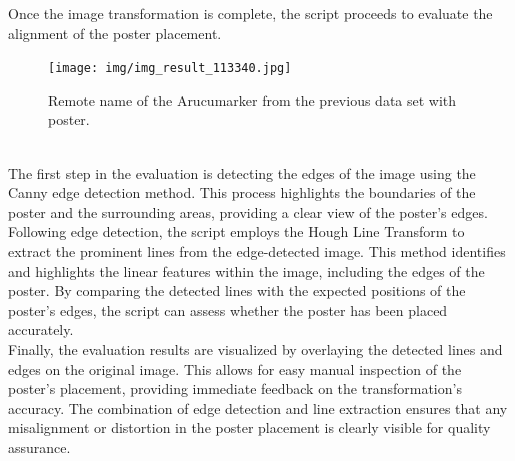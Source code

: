 \documentclass[a4paper,twocolumn]{article}
\begin{document}
Once the image transformation is complete, the script proceeds to evaluate the alignment of the poster placement.
\begin{figure}[h!]
    \centering
    \texttt{[image: img/img\_result\_113340.jpg]} %
    \caption{Remote name of the Arucumarker from the previous data set with poster.}
    \label{fig:example-result}
\end{figure}
 \\
 The first step in the evaluation is detecting the edges of the image using the Canny edge detection method. This process highlights the boundaries of the poster and the surrounding areas, providing a clear view of the poster's edges.
Following edge detection, the script employs the Hough Line Transform to extract the prominent lines from the edge-detected image. This method identifies and highlights the linear features within the image, including the edges of the poster. By comparing the detected lines with the expected positions of the poster's edges, the script can assess whether the poster has been placed accurately.
\\
Finally, the evaluation results are visualized by overlaying the detected lines and edges on the original image. This allows for easy manual inspection of the poster’s placement, providing immediate feedback on the transformation’s accuracy. The combination of edge detection and line extraction ensures that any misalignment or distortion in the poster placement is clearly visible for quality assurance.
\end{document}
